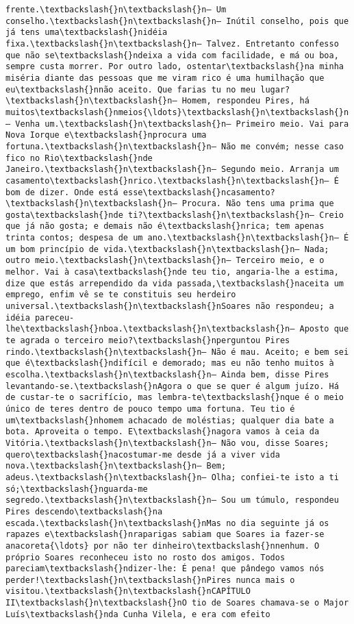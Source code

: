 \documentclass[11pt]{article}
\begin{document}
\begin{Verbatim}[commandchars=\\\{\}]
frente.\textbackslash{}n\textbackslash{}n— Um conselho.\textbackslash{}n\textbackslash{}n— Inútil conselho, pois que já tens uma\textbackslash{}nidéia fixa.\textbackslash{}n\textbackslash{}n— Talvez. Entretanto confesso que não se\textbackslash{}ndeixa a vida com facilidade, e má ou boa, sempre custa morrer. Por outro lado, ostentar\textbackslash{}na minha miséria diante das pessoas que me viram rico é uma humilhação que eu\textbackslash{}nnão aceito. Que farias tu no meu lugar?\textbackslash{}n\textbackslash{}n— Homem, respondeu Pires, há muitos\textbackslash{}nmeios{\ldots}\textbackslash{}n\textbackslash{}n— Venha um.\textbackslash{}n\textbackslash{}n— Primeiro meio. Vai para Nova Iorque e\textbackslash{}nprocura uma fortuna.\textbackslash{}n\textbackslash{}n— Não me convém; nesse caso fico no Rio\textbackslash{}nde Janeiro.\textbackslash{}n\textbackslash{}n— Segundo meio. Arranja um casamento\textbackslash{}nrico.\textbackslash{}n\textbackslash{}n— É bom de dizer. Onde está esse\textbackslash{}ncasamento?\textbackslash{}n\textbackslash{}n— Procura. Não tens uma prima que gosta\textbackslash{}nde ti?\textbackslash{}n\textbackslash{}n— Creio que já não gosta; e demais não é\textbackslash{}nrica; tem apenas trinta contos; despesa de um ano.\textbackslash{}n\textbackslash{}n— É um bom princípio de vida.\textbackslash{}n\textbackslash{}n— Nada; outro meio.\textbackslash{}n\textbackslash{}n— Terceiro meio, e o melhor. Vai à casa\textbackslash{}nde teu tio, angaria-lhe a estima, dize que estás arrependido da vida passada,\textbackslash{}naceita um emprego, enfim vê se te constituis seu herdeiro universal.\textbackslash{}n\textbackslash{}nSoares não respondeu; a idéia pareceu-lhe\textbackslash{}nboa.\textbackslash{}n\textbackslash{}n— Aposto que te agrada o terceiro meio?\textbackslash{}nperguntou Pires rindo.\textbackslash{}n\textbackslash{}n— Não é mau. Aceito; e bem sei que é\textbackslash{}ndifícil e demorado; mas eu não tenho muitos à escolha.\textbackslash{}n\textbackslash{}n— Ainda bem, disse Pires levantando-se.\textbackslash{}nAgora o que se quer é algum juízo. Há de custar-te o sacrifício, mas lembra-te\textbackslash{}nque é o meio único de teres dentro de pouco tempo uma fortuna. Teu tio é um\textbackslash{}nhomem achacado de moléstias; qualquer dia bate a bota. Aproveita o tempo. E\textbackslash{}nagora vamos à ceia da Vitória.\textbackslash{}n\textbackslash{}n— Não vou, disse Soares; quero\textbackslash{}nacostumar-me desde já a viver vida nova.\textbackslash{}n\textbackslash{}n— Bem; adeus.\textbackslash{}n\textbackslash{}n— Olha; confiei-te isto a ti só;\textbackslash{}nguarda-me segredo.\textbackslash{}n\textbackslash{}n— Sou um túmulo, respondeu Pires descendo\textbackslash{}na escada.\textbackslash{}n\textbackslash{}nMas no dia seguinte já os rapazes e\textbackslash{}nraparigas sabiam que Soares ia fazer-se anacoreta{\ldots} por não ter dinheiro\textbackslash{}nnenhum. O próprio Soares reconheceu isto no rosto dos amigos. Todos pareciam\textbackslash{}ndizer-lhe: É pena! que pândego vamos nós perder!\textbackslash{}n\textbackslash{}nPires nunca mais o visitou.\textbackslash{}n\textbackslash{}nCAPÍTULO II\textbackslash{}n\textbackslash{}nO tio de Soares chamava-se o Major Luís\textbackslash{}nda Cunha Vilela, e era com efeito 
\end{Verbatim}
\end{document}
